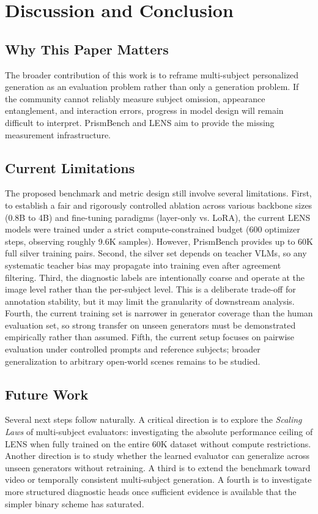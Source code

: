 \section{Discussion and Conclusion}

\subsection{Why This Paper Matters}
The broader contribution of this work is to reframe multi-subject personalized generation as an evaluation problem rather than only a generation problem. If the community cannot reliably measure subject omission, appearance entanglement, and interaction errors, progress in model design will remain difficult to interpret. PrismBench and LENS aim to provide the missing measurement infrastructure.

\subsection{Current Limitations}
The proposed benchmark and metric design still involve several limitations. First, to establish a fair and rigorously controlled ablation across various backbone sizes (0.8B to 4B) and fine-tuning paradigms (layer-only vs. LoRA), the current LENS models were trained under a strict compute-constrained budget (600 optimizer steps, observing roughly 9.6K samples). However, PrismBench provides up to 60K full silver training pairs. Second, the silver set depends on teacher VLMs, so any systematic teacher bias may propagate into training even after agreement filtering. Third, the diagnostic labels are intentionally coarse and operate at the image level rather than the per-subject level. This is a deliberate trade-off for annotation stability, but it may limit the granularity of downstream analysis. Fourth, the current training set is narrower in generator coverage than the human evaluation set, so strong transfer on unseen generators must be demonstrated empirically rather than assumed. Fifth, the current setup focuses on pairwise evaluation under controlled prompts and reference subjects; broader generalization to arbitrary open-world scenes remains to be studied.

\subsection{Future Work}
Several next steps follow naturally. A critical direction is to explore the \textit{Scaling Laws} of multi-subject evaluators: investigating the absolute performance ceiling of LENS when fully trained on the entire 60K dataset without compute restrictions. Another direction is to study whether the learned evaluator can generalize across unseen generators without retraining. A third is to extend the benchmark toward video or temporally consistent multi-subject generation. A fourth is to investigate more structured diagnostic heads once sufficient evidence is available that the simpler binary scheme has saturated.

